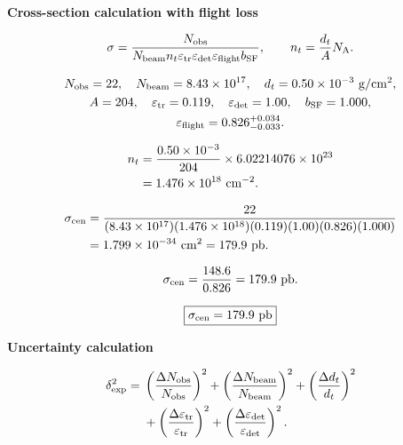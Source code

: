 \documentclass[10pt]{article}
\newcommand{\pb}{\mathrm{pb}}
\begin{document}
\small

\begin{center}
\begin{minipage}[t]{0.49\textwidth}
\centering
\textbf{Cross-section calculation with flight loss}

\vspace{0.25em}

\[
\sigma=
\frac{N_{\rm obs}}
{N_{\rm beam}n_t\varepsilon_{\rm tr}\varepsilon_{\rm det}
 \varepsilon_{\rm flight}b_{\rm SF}},
\qquad
n_t=\frac{d_t}{A}N_{\rm A}.
\]

\[
\begin{gathered}
N_{\rm obs}=22,\quad
N_{\rm beam}=8.43\times10^{17},\quad
d_t=0.50\times10^{-3}~{\rm g/cm^2},\\
A=204,\quad
\varepsilon_{\rm tr}=0.119,\quad
\varepsilon_{\rm det}=1.00,\quad
b_{\rm SF}=1.000,\\
\varepsilon_{\rm flight}=0.826^{+0.034}_{-0.033}.
\end{gathered}
\]

\[
\begin{aligned}
n_t&=\frac{0.50\times10^{-3}}{204}
      \times6.02214076\times10^{23}  \\
   &=1.476\times10^{18}~{\rm cm^{-2}} .
\end{aligned}
\]

\[
\begin{aligned}
\sigma_{\rm cen}&=
\frac{22}
{
(8.43\times10^{17})(1.476\times10^{18})
(0.119)(1.00)(0.826)(1.000)}  \\
&=1.799\times10^{-34}~{\rm cm^2}
 =179.9~\pb .
\end{aligned}
\]

\[
\sigma_{\rm cen}=\frac{148.6}{0.826}=179.9~\pb .
\]

\[
\boxed{
\sigma_{\rm cen}=179.9~\pb
}
\]
\end{minipage}
\hfill
\begin{minipage}[t]{0.49\textwidth}
\centering
\textbf{Uncertainty calculation}

\vspace{0.25em}

\[
\begin{aligned}
\delta_{\rm exp}^2
={}&
\left(\frac{\Delta N_{\rm obs}}{N_{\rm obs}}\right)^2
+\left(\frac{\Delta N_{\rm beam}}{N_{\rm beam}}\right)^2
+\left(\frac{\Delta d_t}{d_t}\right)^2\\
&+\left(\frac{\Delta\varepsilon_{\rm tr}}{\varepsilon_{\rm tr}}\right)^2
+\left(\frac{\Delta\varepsilon_{\rm det}}{\varepsilon_{\rm det}}\right)^2 .
\end{aligned}
\]


\end{minipage}
\end{center}
\end{document}
